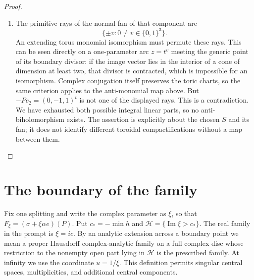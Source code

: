 \documentclass[11pt,a4paper]{article}
\theoremstyle{definition}
\begin{document}
\begin{proof}
\begin{enumerate}[label=\arabic*.]
\item The primitive rays of the normal fan of that component are
\[
\{\pm v:0\ne v\in\{0,1\}^3\}.
\]
An extending torus monomial isomorphism must permute these rays.
This can be seen directly on a one-parameter arc $z=t^v$ meeting the
generic point of its boundary divisor: if the image vector lies in
the interior of a cone of dimension at least two, that divisor is
contracted, which is impossible for an isomorphism.  Complex
conjugation itself preserves the toric charts, so the same criterion
applies to the anti-monomial map above.
But $-Pe_2=(0,-1,1)^t$ is not one of the displayed rays.
This is a contradiction.  We have exhausted both possible integral
linear parts, so no anti-biholomorphism exists.
The assertion is explicitly about the chosen $S$ and its fan; it does
not identify different toroidal compactifications without a map
between them.

\end{enumerate}
\end{proof}


\section{The boundary of the family}

Fix one splitting and write the complex parameter as $\xi$, so that
$F_\xi=(\sigma+\xi\alpha e)(P)$. Put
$c_*=-\min h$ and $\mathcal H=\{\operatorname{Im}\xi>c_*\}$.
The real family in the prompt is $\xi=ic$.
By an analytic extension across a boundary point we mean a proper
Hausdorff complex-analytic family on a full complex disc whose
restriction to the nonempty open part lying in $\mathcal H$ is
the prescribed family. At infinity we use the coordinate $u=1/\xi$.
This definition permits singular central spaces, multiplicities,
and additional central components.
\end{document}
